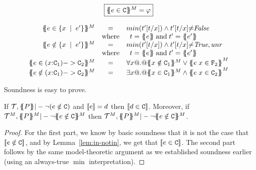 \documentclass[preprint]{sigplanconf}
\begin{document}
\[\begin{array}{c}
\ruleform{\ctrans{\Sigma}{\Gamma}{e \in \Ct}^M = \formula{\phi}} \\ \\
\begin{array}{rcl}
\ctrans{\Sigma}{\Gamma}{e \in \{x\;\mid\;e' \}}^M
  & = & min(t'[t/x]) \land \formula{t'[t/x]{\neq}\False} \\
  & \mbox{where} &
    \begin{array}[t]{l}
      t = \etrans{\Sigma}{\Gamma}{e} \; \text{and} \; t' = \etrans{\Sigma}{\Gamma}{e'}
    \end{array}
\\
\ctrans{\Sigma}{\Gamma}{e \notin \{x\;\mid\;e' \}}^M
  & = & min(t'[t/x]) \land \formula{t'[t/x]{\neq}\True,\unr} \\
  & \mbox{where} &
    \begin{array}[t]{l}
      t = \etrans{\Sigma}{\Gamma}{e} \; \text{and} \; t' = \etrans{\Sigma}{\Gamma}{e'}
    \end{array}
\\
\ctrans{\Sigma}{\Gamma}{e \in (x{:}\Ct_1) -> \Ct_2}^M
  & = & \formula{\forall x @.@ \ctrans{\Sigma}{\Gamma,x}{x \notin \Ct_1}^M
                          \lor \ctrans{\Sigma}{\Gamma,x}{e\;x \in \Ft_2}}^M
\\
\ctrans{\Sigma}{\Gamma}{e \notin (x{:}\Ct_1) -> \Ct_2}^M
  & = & \formula{\exists x @.@ \ctrans{\Sigma}{\Gamma,x}{x \in \Ct_1}^M
                          \land \ctrans{\Sigma}{\Gamma,x}{e\;x \in \Ct_2}}^M
\end{array}
\end{array}\]


Soundness is easy to prove.

\begin{theorem}[Soundness]
If  ${\cal T},\{\!\!\{P\}\!\!\} |- \neg (e \notin {\tt C})$ 
and $[\![e]\!] = d$ then $[\![d \in {\tt C}]\!]$.
Moreover, if $\Th^M,\ptrans{}{P}^M |- \neg \ctrans{}{}{e \notin \Ct}^M$
then $\Th^M,\ptrans{}{P}^M |- \neg \ctrans{}{}{e \notin \Ct}^M$.
\label{lem:in-notin}
\end{theorem}
\begin{proof}
For the first part, we know by basic soundness that it is not the case that 
$[\![e \notin {\tt C}]\!]$, and by Lemma~\ref{lem:in-notin}, we get that 
$[\![e \in {\tt C}]\!]$. The second part follows by the same model-theoretic
argument as we established soundness earlier (using an always-true $\min$
interpretation).
\end{proof}
\end{document}
